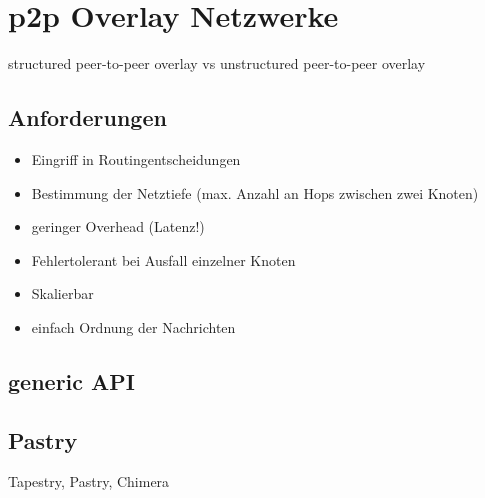 \section{p2p Overlay Netzwerke}
\label{chap:grundlagen:overlay}
structured peer-to-peer overlay vs unstructured peer-to-peer overlay

\subsection{Anforderungen}
\begin{itemize}
\item Eingriff in Routingentscheidungen
\item Bestimmung der Netztiefe (max. Anzahl an Hops zwischen zwei Knoten)
\item geringer Overhead (Latenz!)
\item Fehlertolerant bei Ausfall einzelner Knoten
\item Skalierbar
\item einfach Ordnung der Nachrichten
\end{itemize}

\subsection{generic API}
\cite{citeulike:6643572} %

\subsection{Pastry}
\cite{citeulike:780210} %
Tapestry, Pastry, Chimera
